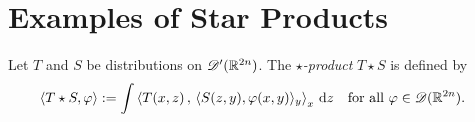 \section{Examples of Star Products}
\label{examples}


\begin{definition}
    Let $ T $ and $ S $ be distributions on $ \mathscr{  D  }'( \mathbb{ R }^{2n} ) $.
    The {\em $\star$-product} $ T \star S $ is defined by
    \begin{align}
        \langle  T \star S  ,  \varphi  \rangle
        &:=
        \int \left\langle  T( x, z )  \,,\,  \langle  S( z, y )  ,  \varphi( x, y )  \rangle_y  \right\rangle_x \,\mathrm{ d }{  z  }
        &&\text{for all $ \varphi \in \mathscr{  D  }( \mathbb{ R }^{2n} ) $.}
    \end{align}
\end{definition}